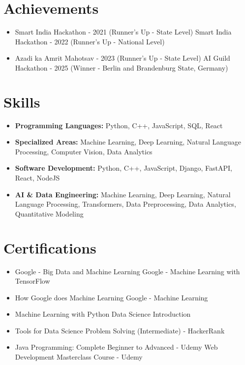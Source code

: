 \documentclass[a4paper,10pt]{article}
\begin{document}
\section*{Achievements}
\begin{itemize}
\item Smart India Hackathon - 2021 (Runner's Up - State Level) \hfill Smart India Hackathon - 2022 (Runner's Up - National Level)
\item Azadi ka Amrit Mahotsav - 2023 (Runner's Up - State Level) \hfill AI Guild Hackathon - 2025 (Winner - Berlin and Brandenburg State, Germany)
\end{itemize}

\section*{Skills}
\begin{itemize}
  \item \textbf{Programming Languages:} Python, C++, JavaScript, SQL, React
  \item \textbf{Specialized Areas:} Machine Learning, Deep Learning, Natural Language Processing, Computer Vision, Data Analytics
  \item \textbf{Software Development:} Python, C++, JavaScript, Django, FastAPI, React, NodeJS
  \item \textbf{AI \& Data Engineering:} Machine Learning, Deep Learning, Natural Language Processing, Transformers, Data Preprocessing, Data Analytics, Quantitative Modeling
\end{itemize}

\section*{Certifications}
\begin{itemize}
\item Google - Big Data and Machine Learning \hfill Google - Machine Learning with TensorFlow
\item How Google does Machine Learning \hfill Google - Machine Learning
\item Machine Learning with Python \hfill Data Science Introduction
\item Tools for Data Science \hfill Problem Solving (Intermediate) - HackerRank
\item Java Programming: Complete Beginner to Advanced - Udemy \hfill Web Development Masterclass Course - Udemy
\end{itemize}
\end{document}
